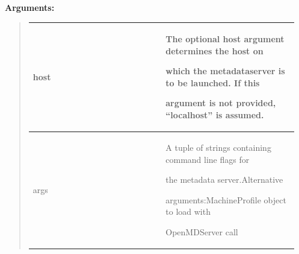 \documentclass[letterpaper,10pt,english]{sphinxmanual}
\begin{document}
\begin{DUlineblock}{0em}
\item[] 
\item[] \textbf{Arguments:}
\end{DUlineblock}
\begin{quote}

\begin{tabular}{|p{0.475\linewidth}|p{0.475\linewidth}|}
\hline

host
 & 
\begin{DUlineblock}{0em}
\item[] The optional host argument determines the host on
\item[] which the metadataserver is to be launched. If this
\item[] argument is not provided, ``localhost'' is assumed.
\end{DUlineblock}
\\
\hline
args
 & 
\begin{DUlineblock}{0em}
\item[] A tuple of strings containing command line flags for
\item[] the metadata server.Alternative
\item[] arguments:MachineProfile object to load with
\item[] OpenMDServer call
\end{DUlineblock}
\\
\hline\end{tabular}

\end{quote}
\end{document}
